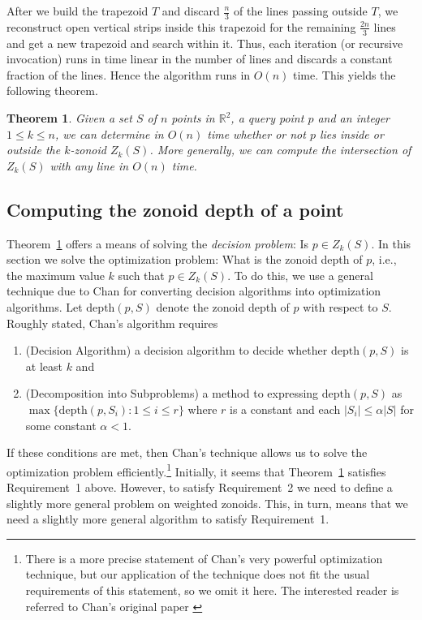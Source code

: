 \documentclass[charterfonts,lotsofwhite]{patmorin}
\newtheorem{theorem}{Theorem}
\newcommand{\depth}{\mathrm{depth}}
\begin{document}
After we build the trapezoid $T$ and discard $\frac{n}{3}$ of the
lines passing outside $T$, we reconstruct open vertical strips inside
this trapezoid for the remaining $\frac{2n}{3}$ lines and get a new
trapezoid and search within it. Thus, each iteration (or recursive
invocation) runs in time linear in the number of lines and discards a
constant fraction of the lines. Hence the algorithm runs in $O(n)$
time. This yields the following theorem.

\begin{theorem}\label{theorem_decision_problem}
Given a set $S$ of $n$ points in $\mathbb{R}^2$, a query point $p$ and
an integer $1 \le k \le n$, we can determine in $O(n)$ time whether or not $p$ lies inside or outside the $k$-zonoid $Z_k(S)$. More generally, we can compute the intersection of $Z_k(S)$ with any line in $O(n)$ time.
\end{theorem}

\subsection{Computing the zonoid depth of a point}
\label{subsection_computing_the_zonoid_depth_of_a_point}

Theorem~\ref{theorem_decision_problem} offers a means of solving the
\emph{decision problem}: Is $p\in Z_k(S)$.  In this section we solve
the optimization problem:  What is the zonoid depth of $p$, i.e., the
maximum value $k$ such that $p\in Z_k(S)$.  To do this, we use a
general technique due to Chan
\cite{geometric_applications_of_a_randomized_optimization_technique}
for converting decision algorithms into optimization algorithms.  Let
$\depth(p,S)$ denote the zonoid depth of $p$ with respect to $S$.
Roughly stated, Chan's algorithm requires
\begin{enumerate}

\item (Decision Algorithm) a decision algorithm to decide whether $\depth(p,S)$ is at least
$k$ and

\item (Decomposition into Subproblems) a method to expressing $\depth(p,S)$ as
$\max\{\depth(p,S_i):1\le i\le r\}$ where $r$ is a constant and each
$|S_i|\le \alpha|S|$ for some constant $\alpha < 1$.

\end{enumerate}

If these conditions are met, then Chan's technique
\cite{geometric_applications_of_a_randomized_optimization_technique}
allows us to solve the optimization problem
efficiently.\footnote{There is a more precise statement of Chan's very
powerful optimization technique, but our application of the technique
does not fit the usual requirements of this statement, so we omit it
here.  The interested reader is referred to Chan's original paper
\cite{geometric_applications_of_a_randomized_optimization_technique}}
Initially, it seems that
Theorem~\ref{theorem_decision_problem}
satisfies Requirement~1 above.  However, to satisfy Requirement~2 we
need to define a slightly more general problem on weighted zonoids.
This, in turn, means that we need a slightly more general algorithm to
satisfy Requirement~1.
\end{document}
